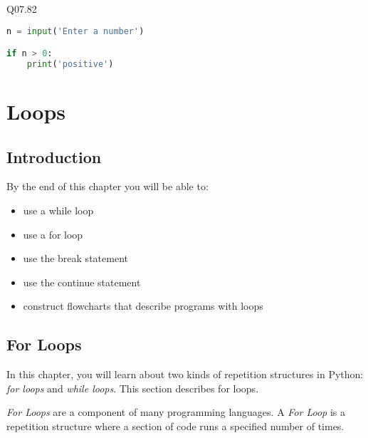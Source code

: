 \documentclass{book}
\begin{document}
    
        Q07.82

\begin{lstlisting}[language=Python]
n = input('Enter a number')

if n > 0:
    print('positive')
\end{lstlisting}
    




    
        \hypertarget{loops}{%
\chapter{Loops}\label{loops}}
    




    
        \hypertarget{introduction}{%
\section{Introduction}\label{introduction}}
    




    
        By the end of this chapter you will be able to:

\begin{itemize}
\item
  use a while loop
\item
  use a for loop
\item
  use the break statement
\item
  use the continue statement
\item
  construct flowcharts that describe programs with loops
\end{itemize}
        \newpage

    




    
        \hypertarget{for-loops}{%
\section{For Loops}\label{for-loops}}
    




    
        In this chapter, you will learn about two kinds of repetition structures
in Python: \emph{for loops} and \emph{while loops}. This section
describes for loops.

\emph{For Loops} are a component of many programming languages. A
\emph{For Loop} is a repetition structure where a section of code runs a
specified number of times.
\end{document}
